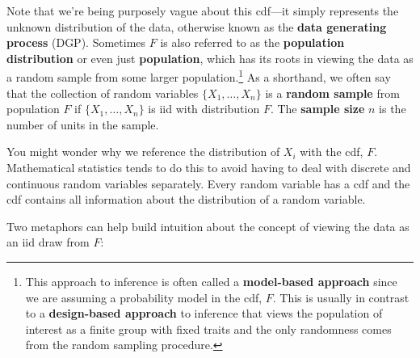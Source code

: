 \documentclass[
  letterpaper,
  DIV=11,
  numbers=noendperiod]{scrreprt}
\theoremstyle{definition}
\theoremstyle{definition}
\theoremstyle{plain}
\theoremstyle{remark}
\begin{document}
Note that we're being purposely vague about this cdf---it simply
represents the unknown distribution of the data, otherwise known as the
\textbf{data generating process} (DGP). Sometimes \(F\) is also referred
to as the \textbf{population distribution} or even just
\textbf{population}, which has its roots in viewing the data as a random
sample from some larger population.\footnote{This approach to inference
  is often called a \textbf{model-based approach} since we are assuming
  a probability model in the cdf, \(F\). This is usually in contrast to
  a \textbf{design-based approach} to inference that views the
  population of interest as a finite group with fixed traits and the
  only randomness comes from the random sampling procedure.} As a
shorthand, we often say that the collection of random variables
\(\{X_1, \ldots, X_n\}\) is a \textbf{random sample} from population
\(F\) if \(\{X_1, \ldots, X_n\}\) is iid with distribution \(F\). The
\textbf{sample size} \(n\) is the number of units in the sample.

\begin{tcolorbox}[enhanced jigsaw, colframe=quarto-callout-note-color-frame, rightrule=.15mm, colback=white, breakable, opacityback=0, coltitle=black, opacitybacktitle=0.6, arc=.35mm, left=2mm, leftrule=.75mm, toptitle=1mm, colbacktitle=quarto-callout-note-color!10!white, titlerule=0mm, title=\textcolor{quarto-callout-note-color}{\faInfo}\hspace{0.5em}{Note}, bottomrule=.15mm, bottomtitle=1mm, toprule=.15mm]

You might wonder why we reference the distribution of \(X_i\) with the
cdf, \(F\). Mathematical statistics tends to do this to avoid having to
deal with discrete and continuous random variables separately. Every
random variable has a cdf and the cdf contains all information about the
distribution of a random variable.

\end{tcolorbox}

Two metaphors can help build intuition about the concept of viewing the
data as an iid draw from \(F\):
\end{document}
